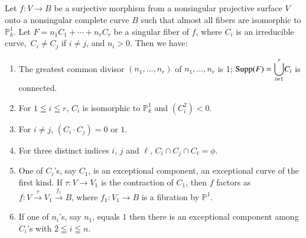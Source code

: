 \subsection{}\label{chap2:2.2}
\begin{lemma*}
  Let $f:V\to B$ be a surjective morphism from a nonsingular projective
  surface $V$ onto a nonsingular complete curve $B$ such that almost all
  fibers are isomorphic to $\mathbb{P}^{1}_{k}$. Let
  $F=n_{1}C_{1}+\cdots+n_{r}C_{r}$ be a singular fiber of $f$, where
  $C_{i}$ is an irreducible curve,\pageoriginale\ $C_{i}\neq C_{j}$ if
  $i\neq j$, and $n_{i}>0$. Then we have:
  \begin{enumerate}
    \renewcommand{\labelenumi}{\rm(\theenumi)}
  \item The greatest common divisor $(n_{1},\ldots,n_{r})$ of
    $n_{1},\ldots,n_{r}$ is 1;\break  
    $\operatorname{Supp}(F)={\displaystyle{\mathop{\bigcup}^{r}_{i=1}}}C_{i}$ is
    connected.
    
  \item For $1\leqq i\leqq r$, $C_{i}$ is isomorphic to
    $\mathbb{P}^{1}_{k}$ and $(C^{2}_{i})<0$.
    
  \item For $i\neq j$, $(C_{i}\cdot C_{j})=0$ or $1$.
    
  \item For three distinct indices $i$, $j$ and $\ell$, $C_{i}\cap
    C_{j}\cap C_{\ell}=\phi$.
    
  \item One of $C_{i}$'s, say $C_{1}$, is an exceptional component, \iec
    an exceptional curve of the first kind. If $\tau:V\to V_{1}$ is the
    contraction of $C_{1}$, then $f$ factors as
    $f:V\xrightarrow{\tau}V_{1}\xrightarrow{f_{1}}B$, where
    $f_{1}:V_{1}\to B$ is a fibration by $\mathbb{P}^{1}$.
    
  \item If one of $n_{i}$'s, say $n_{1}$, equals $1$ then there is an
    exceptional component among $C_{i}$'s with $2\leqq i\leqq n$.
  \end{enumerate}
\end{lemma*}

